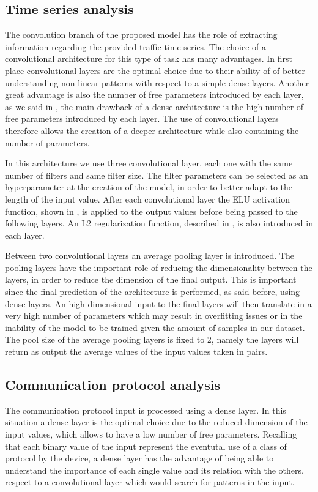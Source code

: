 \subsection{Time series analysis}

The convolution branch of the proposed model has the role of extracting information regarding the provided traffic time series. The choice of a convolutional architecture for this type of task has many advantages. In first place convolutional layers are the optimal choice due to their ability of of better understanding non-linear patterns with respect to a simple dense layers. Another great advantage is also the number of free parameters introduced by each layer, as we said in , the main drawback of a dense architecture is the high number of free parameters introduced by each layer. The use of convolutional layers therefore allows the creation of a deeper architecture while also containing the number of parameters.

In this architecture we use three convolutional layer, each one with the same number of filters and same filter size. The filter parameters can be selected as an hyperparameter at the creation of the model, in order to better adapt to the length of the input value. After each convolutional layer the ELU activation function, shown in , is applied to the output values before being passed to the following layers. An L2 regularization function, described in , is also introduced in each layer.

Between two convolutional layers an average pooling layer is introduced. The pooling layers have the important role of reducing the dimensionality between the layers, in order to reduce the dimension of the final output. This is important since the final prediction of the architecture is performed, as said before, using dense layers. An high dimensional input to the final layers will then translate in a very high number of parameters which may result in overfitting issues or in the inability of the model to be trained given the amount of samples in our dataset. The pool size of the average pooling layers is fixed to 2, namely the layers will return as output the average values of the input values taken in pairs.

\subsection{Communication protocol analysis}
The communication protocol input is processed using a dense layer. In this situation a dense layer is the optimal choice due to the reduced dimension of the input values, which allows to have a low number of free parameters. Recalling that each binary value of the input represent the eventutal use of a class of protocol by the device, a dense layer has the advantage of being able to understand the importance of each single value and its relation with the others, respect to a convolutional layer which would search for patterns in the input.

